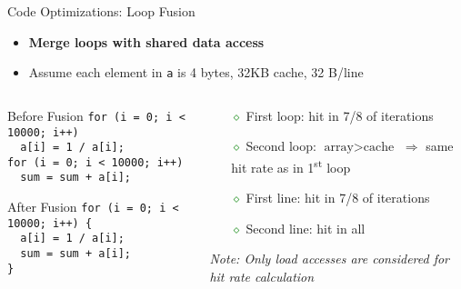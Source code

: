 \documentclass[aspectratio=169,12pt]{beamer}
\begin{document}
\begin{frame}[fragile]{Code Optimizations: Loop Fusion}
\begin{itemize}
  \item \textbf{Merge loops with shared data access}
  \item Assume each element in \texttt{a} is 4 bytes, 32KB cache, 32 B/line
\end{itemize}

\begin{columns}
\begin{column}{0.55\textwidth}
\begin{block}{Before Fusion}
\small
\texttt{for (i = 0; i < 10000; i++)}\\
\texttt{~~a[i] = 1 / a[i];}\\
\texttt{for (i = 0; i < 10000; i++)}\\
\texttt{~~sum = sum + a[i];}
\end{block}

\vspace{0.2cm}
\begin{block}{After Fusion}
\small
\texttt{for (i = 0; i < 10000; i++) \{}\\
\texttt{~~a[i] = 1 / a[i];}\\
\texttt{~~sum = sum + a[i];}\\
\texttt{\}}
\end{block}
\end{column}

\begin{column}{0.45\textwidth}
\begin{itemize}
  \item[\textcolor{green}{$\diamond$}] First loop: hit in 7/8 of iterations
  \item[\textcolor{green}{$\diamond$}] Second loop: $\text{array} > \text{cache}$ $\Rightarrow$ same hit rate as in 1\textsuperscript{st} loop
\end{itemize}

\vspace{1cm}
\begin{itemize}
  \item[\textcolor{green}{$\diamond$}] First line: hit in 7/8 of iterations
  \item[\textcolor{green}{$\diamond$}] Second line: hit in all
\end{itemize}

\vspace{0.2cm}
\footnotesize
\textit{Note: Only load accesses are considered for hit rate calculation}
\end{column}
\end{columns}
\end{frame}
\end{document}
